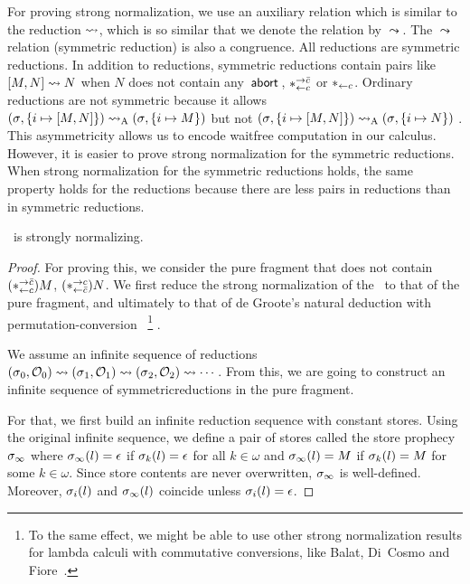 {For proving strong normalization, we use an auxiliary relation which is
similar to the reduction $\rightsquigarrow$, which is so similar that we denote
the relation by $\leadsto$.  The $\leadsto$ relation (symmetric
reduction) is also a
congruence.  All reductions are symmetric reductions.
In addition to reductions, symmetric reductions contain pairs like
$[{M, N}]\leadsto N$ when $N$ does not contain any~$\mathsf{abort\,}$,
$\ast^{\rightarrow {\bar{c}}}_{\leftarrow{c}}$ or $\ast_{\leftarrow{c}}$.
Ordinary reductions are not symmetric because it allows
$({\sigma}{},{\{i\mapsto {[{M,N}]}\}})\rightsquigarrow_{\mathrm A} ({\sigma}{},{\{i\mapsto {M}\}})$
but not
$({\sigma}{},{\{i\mapsto {[{M,N}]}\}})\rightsquigarrow_{\mathrm A} ({\sigma}{},{\{i\mapsto {N}\}})$%
.  This asymmetricity allows us to encode waitfree
computation in our calculus.  However, it is easier to prove strong
normalization for the symmetric reductions.  When strong normalization
for the symmetric reductions holds, the same property holds for the
reductions because there are less pairs in reductions than in symmetric
reductions.

\begin{theorem}
 \label{first:sn}
 \lgd\, is strongly normalizing.
\end{theorem}
\begin{proof}
For proving this, we consider the pure fragment
 that does not contain
$(\ast^{\rightarrow {\bar{c}}}_{\leftarrow{c}})M$, $(\ast^{\rightarrow {c}}_{\leftarrow{\bar{c}}})N$.
We first reduce the strong
normalization of the \lgd\, to that of the pure fragment, and
ultimately to that of de Groote's
natural deduction with permutation-conversion~\cite{Philippe2002js}%
\footnote{
To the
same effect, we might be able to use other strong normalization
 results for lambda calculi with commutative conversions, like Balat,
 Di~Cosmo
 and Fiore~\cite{bdf}.
}%
.

We assume an infinite sequence of reductions
$
({\sigma}{_0},{\mathcal{O}_0})
\rightsquigarrow
({\sigma}{_1},{\mathcal{O}_1})
\rightsquigarrow
({\sigma}{_2},{\mathcal{O}_2})
\rightsquigarrow\cdots
$.
From this, we are going to construct an infinite sequence of
symmetricreductions in the pure fragment.

For that, we first
build an infinite reduction sequence with constant stores.
Using the original infinite sequence, we define a pair of stores called the
store prophecy ${\sigma}_\infty$ where
$ {\sigma}_\infty(l)= \epsilon$ if ${\sigma}_k(l)=\epsilon$ for all
 $k\in\omega$ and
$ {\sigma}_\infty(l)=M $ if ${\sigma}_k(l)=M$ for some $k\in\omega$.
Since store contents are never overwritten,
${\sigma}_\infty$ is well-defined.
Moreover,
${\sigma}_i(l)$ and ${\sigma}_\infty(l)$ coincide unless
${\sigma}_i(l)=\epsilon$.


\end{proof}}
